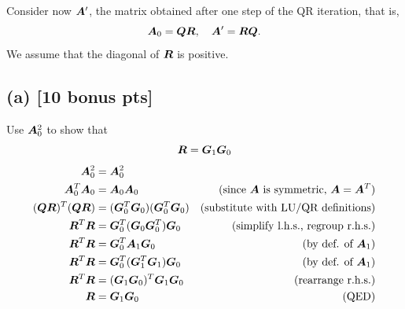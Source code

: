 \documentclass[twoside,10pt]{article}
\begin{document}
Consider now $\bm{A}'$, the matrix obtained after one step of the QR iteration, that is, 
\begin{equation}
  \bm{A}_0 = \bm{Q}\bm{R}, \quad \bm{A}' = \bm{R} \bm{Q}.
\end{equation}
We assume that the diagonal of $\bm{R}$ is positive.

\subsection*{(a) [10 bonus pts]}
Use $\bm{A}_0^2$ to show that 
\begin{equation}
  \bm{R} = \bm{G}_1 \bm{G}_0
\end{equation}
\begin{align*}
  \bm{A}_0^2 &= \bm{A}_0^2\\
  \bm{A}_0^T\bm{A}_0 &= \bm{A}_0\bm{A}_0&\text{(since $\bm{A}$ is symmetric, $\bm{A} = \bm{A}^T$)}\\
  (\bm{Q}\bm{R})^T(\bm{Q}\bm{R}) &= (\bm{G}^T_0 \bm{G}_0)(\bm{G}^T_0 \bm{G}_0)&\text{(substitute with LU/QR definitions)}\\
  \bm{R}^T\bm{R} &= \bm{G}^T_0 (\bm{G}_0\bm{G}^T_0) \bm{G}_0&\text{(simplify l.h.s., regroup r.h.s.)}\\
  \bm{R}^T\bm{R} &= \bm{G}^T_0\bm{A}_{1}\bm{G}_0&\text{(by def. of $\bm{A}_1$)}\\
  \bm{R}^T\bm{R} &= \bm{G}^T_0(\bm{G}_1^T\bm{G}_1)\bm{G}_0&\text{(by def. of $\bm{A}_1$)}\\
  \bm{R}^T\bm{R} &= (\bm{G}_1\bm{G}_0)^T\bm{G}_1\bm{G}_0&\text{(rearrange r.h.s.)}\\
  \bm{R} &= \bm{G}_1\bm{G}_0 &\text{(QED)}
\end{align*}
\end{document}
